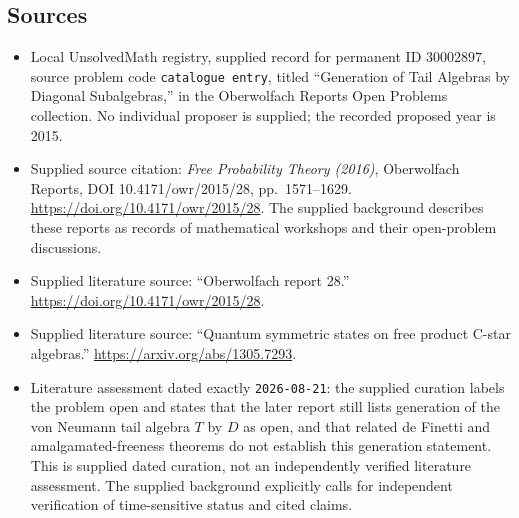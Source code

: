 \documentclass[11pt]{article}
\begin{document}
\subsection{Sources}
\begin{itemize}
\item Local UnsolvedMath registry, supplied record for permanent ID \(30002897\), source problem code \texttt{catalogue entry}, titled ``Generation of Tail Algebras by Diagonal Subalgebras,'' in the Oberwolfach Reports Open Problems collection. No individual proposer is supplied; the recorded proposed year is 2015.
\item Supplied source citation: \emph{Free Probability Theory (2016)}, Oberwolfach Reports, DOI 10.4171/owr/2015/28, pp.\ 1571--1629. \url{https://doi.org/10.4171/owr/2015/28}. The supplied background describes these reports as records of mathematical workshops and their open-problem discussions.
\item Supplied literature source: ``Oberwolfach report 28.'' \url{https://doi.org/10.4171/owr/2015/28}.
\item Supplied literature source: ``Quantum symmetric states on free product C-star algebras.'' \url{https://arxiv.org/abs/1305.7293}.
\item Literature assessment dated exactly \texttt{2026-08-21}: the supplied curation labels the problem open and states that the later report still lists generation of the von Neumann tail algebra \(T\) by \(D\) as open, and that related de Finetti and amalgamated-freeness theorems do not establish this generation statement. This is supplied dated curation, not an independently verified literature assessment. The supplied background explicitly calls for independent verification of time-sensitive status and cited claims.
\end{itemize}
\end{document}
